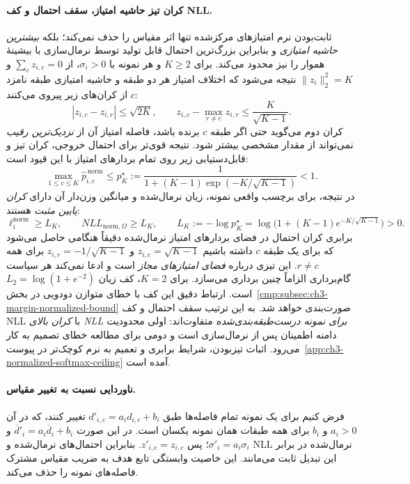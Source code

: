 \paragraph{کران تیز حاشیه امتیاز، سقف احتمال و کف NLL.}
ثابت‌بودن نرم امتیازهای مرکز‌شده
تنها اثر مقیاس را حذف نمی‌کند؛
بلکه \emph{بیشترین حاشیه امتیازی}
و بنابراین بزرگ‌ترین احتمال قابل
تولید توسط نرمال‌سازی با بیشینهٔ هموار را نیز محدود می‌کند.
برای $K\ge2$ و هر نمونه با $\sigma_i>0$،
از $\sum_c z_{i,c}=0$ و
$\|z_i\|_2^2=K$ نتیجه می‌شود
که اختلاف امتیاز هر دو طبقه و
حاشیه امتیازی طبقه نامزد $c$
از کران‌های زیر پیروی می‌کنند:
\begin{equation}\label{cmp:eq:ch3-normalized-score-margin-ceilings}
\boxed{
|z_{i,c}-z_{i,r}|\le\sqrt{2K},
\qquad
z_{i,c}-\max_{r\ne c}z_{i,r}
\le\frac{K}{\sqrt{K-1}}.
}
\end{equation}
کران دوم می‌گوید حتی اگر طبقه $c$
برنده باشد، فاصله امتیاز آن از
\emph{نزدیک‌ترین رقیب} نمی‌تواند
از مقدار مشخصی بیشتر شود.
نتیجه قوی‌تر برای احتمال خروجی،
کران تیز و قابل‌دستیابی زیر روی
تمام بردارهای امتیاز با این قیود است:
\begin{equation}\label{cmp:eq:ch3-normalized-softmax-pmax}
\boxed{
\max_{1\le c\le K}\widehat p_{i,c}^{\,\mathrm{norm}}
\le p_K^\star
:=\frac{1}
{1+(K-1)\exp(-K/\sqrt{K-1})}
<1.
}
\end{equation}
در نتیجه، برای برچسب واقعی نمونه،
زیان نرمال‌شده و میانگین وزن‌دار آن
دارای \emph{کران پایین مثبت} هستند:
\begin{equation}\label{cmp:eq:ch3-normalized-NLL-positive-floor}
\boxed{
\ell_i^{\mathrm{norm}}\ge L_K,
\qquad
NLL_{\mathrm{norm},\Omega}\ge L_K,
\qquad
L_K:=-\log p_K^\star
=\log\bigl(1+(K-1)e^{-K/\sqrt{K-1}}\bigr)>0.
}
\end{equation}
برابری کران احتمال در فضای
بردارهای امتیاز نرمال‌شده
دقیقاً هنگامی حاصل می‌شود که
برای یک طبقه $c$ داشته باشیم
$z_{i,c}=\sqrt{K-1}$ و
$z_{i,r}=-1/\sqrt{K-1}$
برای همه $r\ne c$.
این تیزی درباره \emph{فضای امتیازهای مجاز}
است و ادعا نمی‌کند هر سیاست
گام‌برداری الزاماً چنین برداری می‌سازد.
برای $K=2$، کف زیان
$L_2=\log(1+e^{-2})$ است.
ارتباط دقیق این کف با خطای
متوازن دودویی در
بخش~\ref{cmp:subsec:ch3-margin-normalized-bound}
صورت‌بندی خواهد شد.
به این ترتیب سقف احتمال و کف NLL
با \emph{کران بالای NLL برای نمونه
درست‌طبقه‌بندی‌شده} متفاوت‌اند:
اولی محدودیت دامنه اطمینان
پس از نرمال‌سازی است و دومی
برای مطالعه خطای تصمیم به کار می‌رود.
اثبات تیزبودن، شرایط برابری و
تعمیم به نرم کوچک‌تر در
پیوست~\ref{app:ch3-normalized-softmax-ceiling}
آمده است.

\paragraph{ناوردایی نسبت به تغییر مقیاس.}
فرض کنیم برای یک نمونه تمام فاصله‌ها طبق $d'_{i,c}=a_i d_{i,c}+b_i$ تغییر کنند، که در آن $a_i>0$ و $b_i$ برای همه طبقات همان نمونه یکسان است. در این صورت $\overline d'_i=a_i\overline d_i+b_i$ و $\sigma'_i=a_i\sigma_i$؛ پس $z'_{i,c}=z_{i,c}$. بنابراین احتمال‌های نرمال‌شده و NLL نرمال‌شده در برابر این تبدیل ثابت می‌مانند. این خاصیت وابستگی تابع هدف به ضریب مقیاس مشترک فاصله‌های نمونه را حذف می‌کند.

